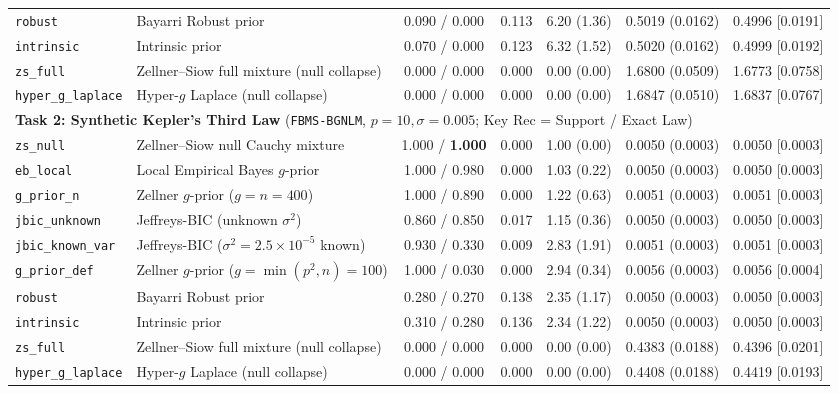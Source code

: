 \documentclass[11pt,a4paper]{article}
\begin{document}
\begin{table}[htbp]
{\begin{tabular}{llccccc}
\texttt{robust} & Bayarri Robust prior & 0.090 / 0.000 & 0.113 & 6.20 (1.36) & 0.5019 (0.0162) & 0.4996 [0.0191] \\
\texttt{intrinsic} & Intrinsic prior & 0.070 / 0.000 & 0.123 & 6.32 (1.52) & 0.5020 (0.0162) & 0.4999 [0.0192] \\
\texttt{zs\_full} & Zellner--Siow full mixture (null collapse) & 0.000 / 0.000 & 0.000 & 0.00 (0.00) & 1.6800 (0.0509) & 1.6773 [0.0758] \\
\texttt{hyper\_g\_laplace} & Hyper-$g$ Laplace (null collapse) & 0.000 / 0.000 & 0.000 & 0.00 (0.00) & 1.6847 (0.0510) & 1.6837 [0.0767] \\
\midrule
\multicolumn{7}{l}{\textbf{Task 2: Synthetic Kepler's Third Law} (\texttt{FBMS-BGNLM}, $p = 10, \sigma = 0.005$; Key Rec = Support / Exact Law)} \\
\texttt{zs\_null} & Zellner--Siow null Cauchy mixture & 1.000 / \textbf{1.000} & 0.000 & 1.00 (0.00) & 0.0050 (0.0003) & 0.0050 [0.0003] \\
\texttt{eb\_local} & Local Empirical Bayes $g$-prior & 1.000 / 0.980 & 0.000 & 1.03 (0.22) & 0.0050 (0.0003) & 0.0050 [0.0003] \\
\texttt{g\_prior\_n} & Zellner $g$-prior ($g = n = 400$) & 1.000 / 0.890 & 0.000 & 1.22 (0.63) & 0.0051 (0.0003) & 0.0051 [0.0003] \\
\texttt{jbic\_unknown} & Jeffreys-BIC (unknown $\sigma^2$) & 0.860 / 0.850 & 0.017 & 1.15 (0.36) & 0.0050 (0.0003) & 0.0050 [0.0003] \\
\texttt{jbic\_known\_var} & Jeffreys-BIC ($\sigma^2 = 2.5\times 10^{-5}$ known) & 0.930 / 0.330 & 0.009 & 2.83 (1.91) & 0.0051 (0.0003) & 0.0051 [0.0003] \\
\texttt{g\_prior\_def} & Zellner $g$-prior ($g = \min(p^2, n) = 100$) & 1.000 / 0.030 & 0.000 & 2.94 (0.34) & 0.0056 (0.0003) & 0.0056 [0.0004] \\
\texttt{robust} & Bayarri Robust prior & 0.280 / 0.270 & 0.138 & 2.35 (1.17) & 0.0050 (0.0003) & 0.0050 [0.0003] \\
\texttt{intrinsic} & Intrinsic prior & 0.310 / 0.280 & 0.136 & 2.34 (1.22) & 0.0050 (0.0003) & 0.0050 [0.0003] \\
\texttt{zs\_full} & Zellner--Siow full mixture (null collapse) & 0.000 / 0.000 & 0.000 & 0.00 (0.00) & 0.4383 (0.0188) & 0.4396 [0.0201] \\
\texttt{hyper\_g\_laplace} & Hyper-$g$ Laplace (null collapse) & 0.000 / 0.000 & 0.000 & 0.00 (0.00) & 0.4408 (0.0188) & 0.4419 [0.0193] \\

\end{tabular}}
\end{table}
\end{document}
